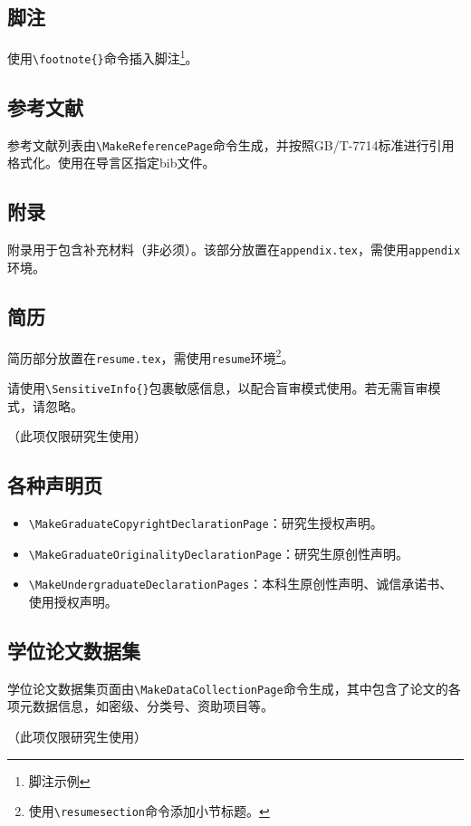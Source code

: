\subsection{脚注}
使用\verb|\footnote{}|命令插入脚注\footnote{脚注示例}。

\subsection{参考文献}
参考文献列表由\verb|\MakeReferencePage|命令生成，并按照GB/T-7714标准进行引用格式化。使用\verb||在导言区指定bib文件。

\subsection{附录}
附录用于包含补充材料（非必须）。该部分放置在\texttt{appendix.tex}，需使用\texttt{appendix}环境。

\subsection{简历}
简历部分放置在\texttt{resume.tex}，需使用\texttt{resume}环境\footnote{使用\texttt{\textbackslash resumesection{}}命令添加小节标题。}。

请使用\verb|\SensitiveInfo{}|包裹敏感信息，以配合盲审模式使用。若无需盲审模式，请忽略。

（此项仅限研究生使用）

\subsection{各种声明页}
\begin{itemize}[itemsep=2pt,topsep=5pt]
  \sloppy
  \item \verb|\MakeGraduateCopyrightDeclarationPage|：研究生授权声明。
  \item \verb|\MakeGraduateOriginalityDeclarationPage|：研究生原创性声明。
  \item \verb|\MakeUndergraduateDeclarationPages|：本科生原创性声明、诚信承诺书、使用授权声明。 
\end{itemize}

\subsection{学位论文数据集}
学位论文数据集页面由\verb|\MakeDataCollectionPage|命令生成，其中包含了论文的各项元数据信息，如密级、分类号、资助项目等。

（此项仅限研究生使用）

